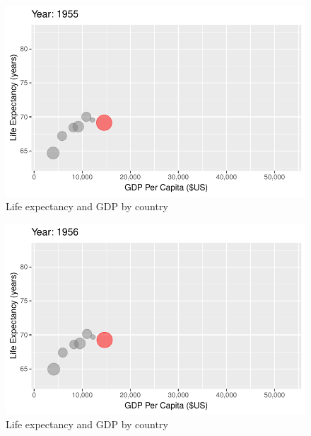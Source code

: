 \documentclass[
  letterpaper,
  DIV=11,
  numbers=noendperiod]{scrreport}
\theoremstyle{definition}
\theoremstyle{remark}
\begin{document}
\begin{figure}

{\centering \includegraphics{index_files/figure-pdf/fig-anim-country-7.pdf}

}

\caption{\label{fig-anim-country-7}Life expectancy and GDP by country}

\end{figure}

\begin{figure}

{\centering \includegraphics{index_files/figure-pdf/fig-anim-country-8.pdf}

}

\caption{\label{fig-anim-country-8}Life expectancy and GDP by country}

\end{figure}
\end{document}
